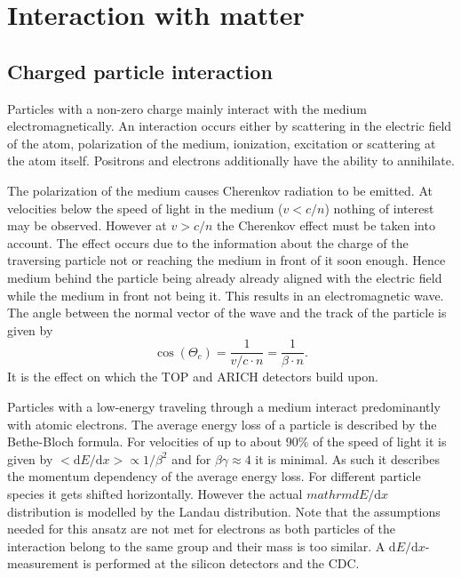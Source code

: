 \section{Interaction with matter}
\label{sec:interaction_with_matter}

\subsection{Charged particle interaction}
\label{subsec:interaction_with_matter}

Particles with a non-zero charge mainly interact with the medium electromagnetically. An interaction occurs either by scattering in the electric field of the atom, polarization of the medium, ionization, excitation or scattering at the atom itself. Positrons and electrons additionally have the ability to annihilate.

The polarization of the medium causes Cherenkov radiation to be emitted. At velocities below the speed of light in the medium ($v < c/n$) nothing of interest may be observed. However at $v > c/n$ the Cherenkov effect must be taken into account. The effect occurs due to the information about the charge of the traversing particle not or reaching the medium in front of it soon enough. Hence medium behind the particle being already already aligned with the electric field while the medium in front not being it. This results in an electromagnetic wave. The angle between the normal vector of the wave and the track of the particle is given by
\begin{equation*}
    \cos(\Theta_{c}) = \frac{1}{v/c \cdot n} = \frac{1}{\beta \cdot n}
    \mathrm{.}
\end{equation*}
It is the effect on which the TOP and ARICH detectors build upon.

Particles with a low-energy traveling through a medium interact predominantly with atomic electrons. The average energy loss of a particle is described by the Bethe-Bloch formula. For velocities of up to about $90\%$ of the speed of light it is given by $<\mathrm{d}E/\mathrm{d}x> \propto 1/{\beta^2}$ and for $\beta \gamma \approx 4$ it is minimal. As such it describes the momentum dependency of the average energy loss. For different particle species it gets shifted horizontally. However the actual $mathrm{d}E/\mathrm{d}x$ distribution is modelled by the Landau distribution. Note that the assumptions needed for this ansatz are not met for electrons as both particles of the interaction belong to the same group and their mass is too similar.
A $\mathrm{d}E/\mathrm{d}x$-measurement is performed at the silicon detectors and the CDC.

